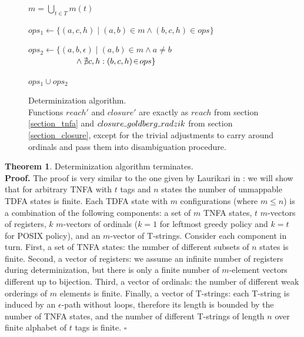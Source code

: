 \documentclass{article}
\newcommand{\Xset}{\!\leftarrow\!}
\newcommand{\Xund}{\rule{.4em}{.4pt}} %
\newcommand{\Xin}{\!\in\!}
\newcommand{\Xeq}{\!=\!}
\theoremstyle{definition}
\newtheorem{XThe}{Theorem}
\begin{document}
\begin{multicols}{2}
\begin{figure}
\begin{multicols}{2}
\begin{algorithm}[H]
{{            \Let $m \Xeq \bigcup_{t \in T} m(t)$ \;

            $ops_1 \Xset \{ (a, c, h) \mid (a, b) \Xin m \wedge (b, c, h) \Xin ops \}$ \;

            $ops_2 \Xset \{ (a, b, \epsilon) \mid (a, b) \Xin m \wedge a \!\neq\! b$
                $\hphantom{hspace{1.5em}} \wedge \nexists c, h: (b, c, h) \Xin ops \}$ \;

            \Return $ops_1 \cup ops_2$ \;
        } \lElse {
            \Return \Und
        }
    }
    \end{algorithm}

\end{multicols}
\begin{center}
\caption{Determinization algorithm.\\
Functions $reach'$ and $closure'$ are exactly as
$reach$ from section \ref{section_tnfa} and $closure \Xund goldberg \Xund radzik$ from section \ref{section_closure},
except for the trivial adjustments to carry around ordinals and pass them into disambiguation procedure.
}
\end{center}
\end{figure}

\begin{XThe}
Determinization algorithm terminates.
\\[0.5em]
\textbf{Proof.}
The proof is very similar to the one given by Laurikari in \cite{Lau00}:
we will show that for arbitrary TNFA with $t$ tags and $n$ states the number of unmappable TDFA states is finite.
Each TDFA state with $m$ configurations (where $m \!\leq\! n$) is a combination of the following components:
a set of $m$ TNFA states,
$t$ $m$-vectors of registers,
$k$ $m$-vectors of ordinals ($k \Xeq 1$ for leftmost greedy policy and $k \Xeq t$ for POSIX policy),
and an $m$-vector of T-strings.
Consider each component in turn.
First, a set of TNFA states: the number of different subsets of $n$ states is finite.
Second, a vector of registers: we assume an infinite number of registers during determinization,
but there is only a finite number of $m$-element vectors different up to bijection.
Third, a vector of ordinals: the number of different weak orderings of $m$ elements is finite.
Finally, a vector of T-strings: each T-string is induced by an $\epsilon$-path without loops,
therefore its length is bounded by the number of TNFA states,
and the number of different T-strings of length $n$ over finite alphabet of $t$ tags is finite.
$\square$
\end{XThe}


\end{multicols}
\end{document}
